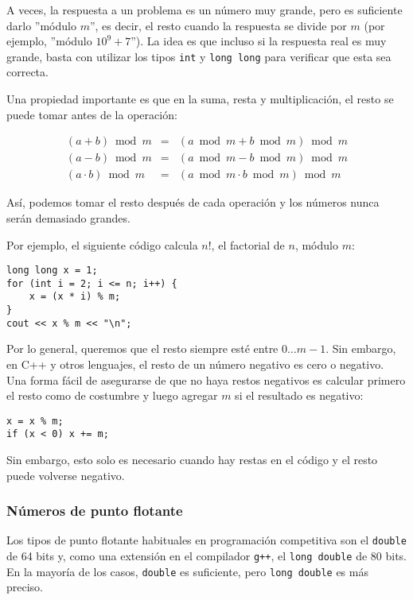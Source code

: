 A veces, la respuesta a un problema es un
número muy grande, pero es suficiente
darlo ''módulo $m$'', es decir,
el resto cuando la respuesta se divide por $m$
(por ejemplo, ''módulo $10^9+7$'').
La idea es que incluso si la respuesta real
es muy grande, basta con utilizar los tipos
\texttt{int} y \texttt{long long} para verificar
que esta sea correcta.

Una propiedad importante es que
en la suma, resta y multiplicación,
el resto se puede tomar antes de la operación:

\[
\begin{array}{rcr}
(a+b) \bmod m & = & (a \bmod m + b \bmod m) \bmod m \\
(a-b) \bmod m & = & (a \bmod m - b \bmod m) \bmod m \\
(a \cdot b) \bmod m & = & (a \bmod m \cdot b \bmod m) \bmod m
\end{array}
\]

Así, podemos tomar el resto después de cada operación
y los números nunca serán demasiado grandes.

Por ejemplo, el siguiente código calcula $n!$,
el factorial de $n$, módulo $m$:
\begin{lstlisting}
long long x = 1;
for (int i = 2; i <= n; i++) {
    x = (x * i) % m;
}
cout << x % m << "\n";
\end{lstlisting}

Por lo general, queremos que el resto siempre
esté entre $0\ldots m-1$.
Sin embargo, en C++ y otros lenguajes,
el resto de un número negativo
es cero o negativo.
Una forma fácil de asegurarse de que no haya
restos negativos es calcular primero
el resto como de costumbre y luego agregar $m$
si el resultado es negativo:
\begin{lstlisting}
x = x % m;
if (x < 0) x += m;
\end{lstlisting}
Sin embargo, esto solo es necesario cuando hay
restas en el código y el
resto puede volverse negativo.

\subsubsection{Números de punto flotante}


Los tipos de punto flotante habituales en
programación competitiva son
el \texttt{double} de 64 bits
y, como una extensión en el compilador \texttt{g++},
el \texttt{long double} de 80 bits.
En la mayoría de los casos, \texttt{double} es suficiente,
pero \texttt{long double} es más preciso.

